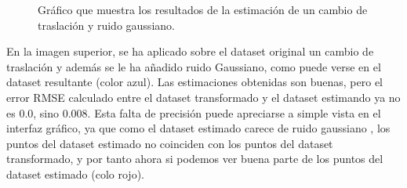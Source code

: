 \begin{figure}
\begin{center}
\hspace{0.5cm}

\end{center}

\caption{Gráfico que muestra los resultados de la estimación de un cambio de traslación y ruido gaussiano.}
\end{figure}
En la imagen superior, se ha aplicado sobre el dataset original un cambio de traslación y además se le ha añadido ruido Gaussiano, como puede verse en el dataset resultante (color azul). Las estimaciones obtenidas son buenas, pero el error RMSE calculado entre el dataset transformado y el dataset estimando ya no es 0.0, sino 0.008. Esta falta de precisión puede apreciarse a simple vista en el interfaz gráfico, ya que como el dataset estimado carece de ruido gaussiano , los puntos del dataset estimado no coinciden con los puntos del dataset transformado, y por tanto ahora si podemos ver buena parte de los puntos del dataset estimado (colo rojo).


